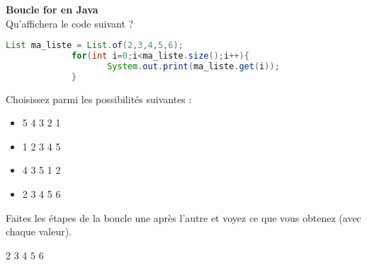     
    \begin{Exercice}[5 minutes] \textbf{Boucle for en Java}\\
      	Qu'affichera le code suivant ?
      	
      	\begin{lstlisting}[language=Java]
             List ma_liste = List.of(2,3,4,5,6);
             for(int i=0;i<ma_liste.size();i++){
            		System.out.print(ma_liste.get(i));
             }
        	 \end{lstlisting}
             	
        Choisissez parmi les possibilités suivantes :
        
        \begin{itemize}
        
        \item 5 
        4 
        3 
        2 
        1 
        \item 1  
        2 
        3 
        4 
        5 
        \item 4 
        3 
        5 
        1 
        2 
        \item 2 
        3 
        4 
        5 
        6
        \end{itemize}
    
        \begin{conseil}
		   Faites les étapes de la boucle une après l'autre et voyez ce que vous obtenez (avec chaque valeur).  
        \end{conseil}
        
        \begin{solution}
            2 
            3 
            4 
            5 
            6
        \end{solution}
    \end{Exercice} 	
    
